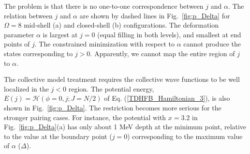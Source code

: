 \documentclass[%
superscriptaddress,
preprint,
showpacs,
nofootinbib,
amsmath,amssymb,
aps,
prc,
floatfix ]%
{revtex4-1}
\begin{document}

The problem is that
there is no one-to-one correspondence between $j$ and $\alpha$.
The relation between $j$ and $\alpha$ 
are shown by dashed lines in Fig.~\ref{fig:p_Delta}
for $\Omega=8$ mid-shell (a) and closed-shell (b) configurations.
The deformation parameter $\alpha$ is largest at $j=0$ (equal filling in both levels),
and smallest at end points of $j$.
The constrained minimization with respect to $\alpha$ cannot 
produce the states corresponding to $j>0$.
Apparently, we cannot map the entire region of $j$ to $\alpha$.

The collective model treatment
requires the collective wave functions to be well localized
in the $j<0$ region.
The potential energy, $E(j)=\mathcal{H}(\phi=0,j;J=N/2)$ of
Eq. (\ref{TDHFB_Hamiltonian_3}), is also shown in
Fig.~\ref{fig:p_Delta}.
The restriction becomes more serious for the stronger pairing cases.
For instance, the potential with $x=3.2$ in Fig.~\ref{fig:p_Delta}(a)
has only about 1 MeV depth at the minimum point, relative to the value
at the boundary point ($j=0$) corresponding to
the maximum value of $\alpha$ ($\Delta$).
\end{document}
